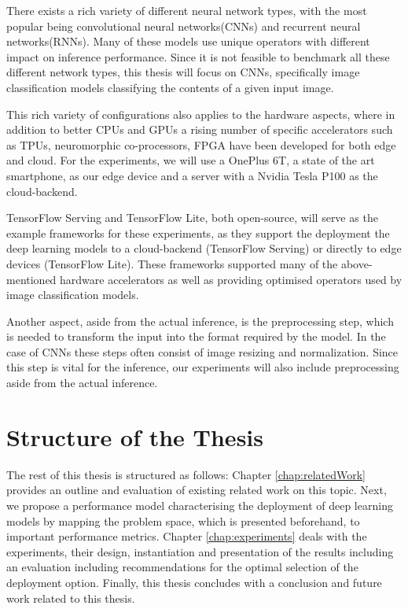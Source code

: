 There exists a rich variety of different neural network types, with the most popular being convolutional neural networks(CNNs) and recurrent neural networks(RNNs).
Many of these models use unique operators with different impact on inference performance.
Since it is not feasible to benchmark all these different network types, this thesis will focus on CNNs, specifically image classification models classifying the contents of a given input image.




This rich variety of configurations also applies to the hardware aspects, where in addition to better CPUs and GPUs a rising number of specific accelerators such as TPUs, neuromorphic co-processors, FPGA have been developed for both edge and cloud.
For the experiments, we will use a OnePlus 6T, a state of the art smartphone, as our edge device and a server with a Nvidia Tesla P100 as the cloud-backend.


TensorFlow Serving and TensorFlow Lite, both open-source, will serve as the example frameworks for these experiments, as they support the deployment the deep learning models to a cloud-backend (TensorFlow Serving) or directly to edge devices (TensorFlow Lite). These frameworks supported many of the above-mentioned hardware accelerators as well as providing optimised operators used by image classification models.

Another aspect, aside from the actual inference, is the preprocessing step, which is needed to transform the input into the format required by the model. 
In the case of CNNs these steps often consist of image resizing and normalization.
Since this step is vital for the inference, our experiments will also include preprocessing aside from the actual inference.

\section{Structure of the Thesis}
The rest of this thesis is structured as follows: Chapter \ref{chap:relatedWork} provides an outline and evaluation of existing related work on this topic. Next, we propose a performance model characterising the deployment of deep learning models by mapping the problem space, which is presented beforehand, to important performance metrics.
Chapter \ref{chap:experiments} deals with the experiments, their design, instantiation and presentation of the results including an evaluation including recommendations for the optimal selection of the deployment option.
Finally, this thesis concludes with a conclusion and future work related to this thesis.
